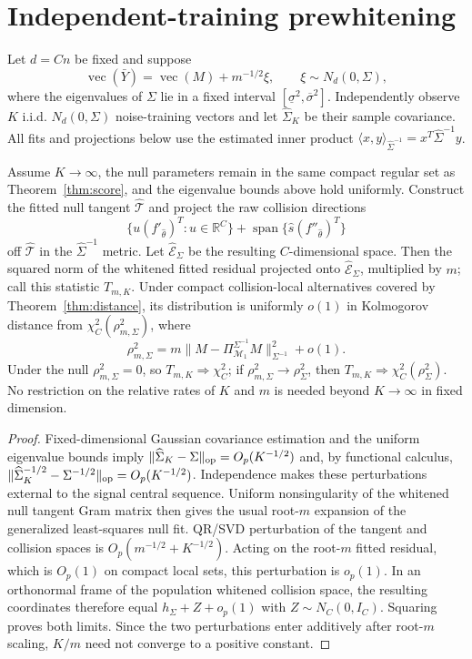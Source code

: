 \section{Independent-training prewhitening}
\label{app:whitening}

Let $d=Cn$ be fixed and suppose
\[
\operatorname{vec}(\bar Y)=\operatorname{vec}(M)+m^{-1/2}\xi,
\qquad \xi\sim N_d(0,\Sigma),
\]
where the eigenvalues of $\Sigma$ lie in a fixed interval
$[\underline\sigma^2,\overline\sigma^2]$. Independently observe $K$ i.i.d.
$N_d(0,\Sigma)$ noise-training vectors and let $\widehat\Sigma_K$ be their
sample covariance. All fits and projections below use the estimated
inner product
$\langle x,y\rangle_{\widehat\Sigma^{-1}}=x^T\widehat\Sigma^{-1}y$.

\begin{theorem}
\label{thm:whitening}
Assume $K\to\infty$, the null parameters remain in the same compact regular
set as Theorem~\ref{thm:score}, and the eigenvalue bounds above hold uniformly.
Construct the fitted null tangent $\widehat{\mathcal T}$ and project the raw
collision directions
\[
\{u(f'_{\widehat\theta})^T:u\in\mathbb R^C\}
+\operatorname{span}\{\widehat s(f''_{\widehat\theta})^T\}
\]
off $\widehat{\mathcal T}$ in the
$\widehat\Sigma^{-1}$ metric.  Let $\widehat{\mathcal E}_\Sigma$ be the
resulting $C$-dimensional space.  Then the squared norm of the whitened fitted
residual projected onto $\widehat{\mathcal E}_\Sigma$, multiplied by $m$; call
this statistic $T_{m,K}$. Under compact collision-local alternatives covered
by Theorem~\ref{thm:distance}, its distribution is uniformly $o(1)$ in
Kolmogorov distance from $\chi_C^2(\rho_{m,\Sigma}^2)$, where
\[
\rho_{m,\Sigma}^2=
m\|M-\Pi_{\mathcal M_1}^{\Sigma^{-1}}M\|_{\Sigma^{-1}}^2+o(1).
\]
Under the null $\rho_{m,\Sigma}^2=0$, so $T_{m,K}\Rightarrow\chi_C^2$; if
$\rho_{m,\Sigma}^2\to\rho_\Sigma^2$, then
$T_{m,K}\Rightarrow\chi_C^2(\rho_\Sigma^2)$.
No restriction on the relative rates of $K$ and $m$ is needed beyond
$K\to\infty$ in fixed dimension.
\end{theorem}

\begin{proof}
Fixed-dimensional Gaussian covariance estimation and the uniform eigenvalue
bounds imply
$\|\widehat\Sigma_K-\Sigma\|_{\rm op}=O_p(K^{-1/2})$ and, by functional
calculus,
$\|\widehat\Sigma_K^{-1/2}-\Sigma^{-1/2}\|_{\rm op}=O_p(K^{-1/2})$.
Independence makes these perturbations external to the signal central
sequence.  Uniform nonsingularity of the whitened null tangent Gram matrix
then gives the usual root-$m$ expansion of the generalized least-squares null
fit.  QR/SVD perturbation of the tangent and collision spaces is
$O_p(m^{-1/2}+K^{-1/2})$.  Acting on the root-$m$ fitted residual, which is
$O_p(1)$ on compact local sets, this perturbation is $o_p(1)$.  In an
orthonormal frame of the population whitened collision space, the resulting
coordinates therefore equal $h_\Sigma+Z+o_p(1)$ with
$Z\sim N_C(0,I_C)$.  Squaring proves both limits.  Since the two perturbations
enter additively after root-$m$ scaling, $K/m$ need not converge to a positive
constant.
\end{proof}

